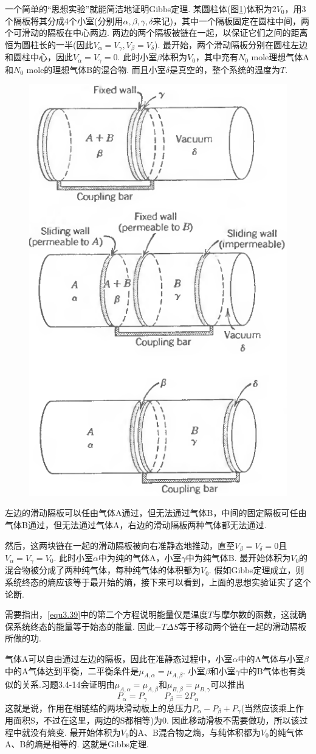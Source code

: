 一个简单的“思想实验”就能简洁地证明Gibbs定理. 某圆柱体(图\ref{fig3.2})体积为$2V_0$，用3个隔板将其分成4个小室(分别用$\alpha,\beta,\gamma,\delta$来记)，其中一个隔板固定在圆柱中间，两个可滑动的隔板在中心两边. 两边的两个隔板被链在一起，以保证它们之间的距离恒为圆柱长的一半(因此$V_\alpha=V_\gamma, V_\beta=V_\delta$). 最开始，两个滑动隔板分别在圆柱左边和圆柱中心，因此$V_\alpha=V_\gamma=0$. 此时小室$\beta$体积为$V_0$，其中充有$N_0$  mole理想气体A和$N_0$ mole的理想气体B的混合物. 而且小室$\delta$是真空的，整个系统的温度为$T$.

\begin{figure}
\centering
\includegraphics[width=.5\textwidth]{Pictures/fig3.2.png}
\label{fig3.2}
\end{figure}

左边的滑动隔板可以任由气体A通过，但无法通过气体B，中间的固定隔板可任由气体B通过，但无法通过气体A，右边的滑动隔板两种气体都无法通过.

然后，这两块链在一起的滑动隔板被向右准静态地推动，直至$V_\beta=V_\delta=0$且$V_\alpha=V_\gamma=V_0$. 此时小室$\alpha$中为纯的气体A，小室$\gamma$中为纯气体B. 最开始体积为$V_0$的混合物被分成了两种纯气体，每种纯气体的体积都为$V_0$. 假如Gibbs定理成立，则系统终态的熵应该等于最开始的熵，接下来可以看到，上面的思想实验证实了这个论断.

需要指出，\eqref{equ3.39}中的第二个方程说明能量仅是温度$T$与摩尔数的函数，这就确保系统终态的能量等于始态的能量. 因此$-T\Delta S$等于移动两个链在一起的滑动隔板所做的功.

气体A可以自由通过左边的隔板，因此在准静态过程中，小室$\alpha$中的A气体与小室$\beta$中的A气体达到平衡，二平衡条件是$\mu_{A,\alpha}=\mu_{A,\beta}$. 小室$\beta$和小室$\gamma$中的B气体也有类似的关系.习题3.4-14会证明由$\mu_{A,\alpha}=\mu_{A,\beta}$和$\mu_{B,\beta}=\mu_{B,\gamma}$可以推出
\begin{equation*}
P_\alpha=P_\gamma \qquad P_\beta=2P_\alpha
\end{equation*}
这就是说，作用在相链结的两块滑动板上的总压力$P_\alpha-P_\beta+ P_\gamma$(当然应该乘上作用面积S，不过在这里，两边的S都相等)为0. 因此移动滑板不需要做功，所以该过程中就没有熵变. 最开始体积为$V_0$的A、B混合物之熵，与纯体积都为$V_0$的纯气体A、B的熵是相等的. 这就是Gibbs定理.

